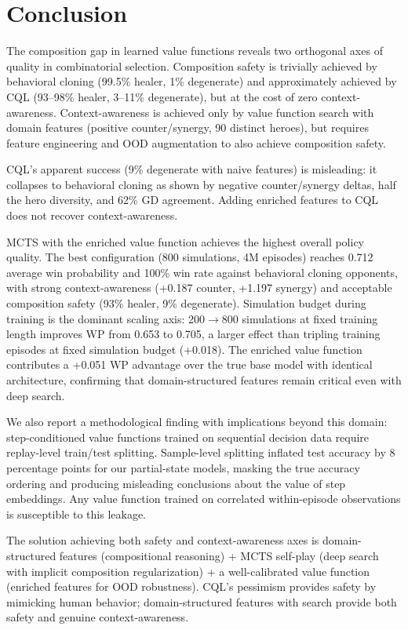 \documentclass[journal]{IEEEtran}
\begin{document}
\section{Conclusion}

The composition gap in learned value functions reveals two orthogonal axes of quality in combinatorial selection. Composition safety is trivially achieved by behavioral cloning (99.5\% healer, 1\% degenerate) and approximately achieved by CQL (93--98\% healer, 3--11\% degenerate), but at the cost of zero context-awareness. Context-awareness is achieved only by value function search with domain features (positive counter/synergy, 90 distinct heroes), but requires feature engineering and OOD augmentation to also achieve composition safety.

CQL's apparent success (9\% degenerate with naive features) is misleading: it collapses to behavioral cloning as shown by negative counter/synergy deltas, half the hero diversity, and 62\% GD agreement. Adding enriched features to CQL does not recover context-awareness.

MCTS with the enriched value function achieves the highest overall policy quality. The best configuration (800 simulations, 4M episodes) reaches 0.712 average win probability and 100\% win rate against behavioral cloning opponents, with strong context-awareness (+0.187 counter, +1.197 synergy) and acceptable composition safety (93\% healer, 9\% degenerate). Simulation budget during training is the dominant scaling axis: 200$\to$800 simulations at fixed training length improves WP from 0.653 to 0.705, a larger effect than tripling training episodes at fixed simulation budget (+0.018). The enriched value function contributes a +0.051 WP advantage over the true base model with identical architecture, confirming that domain-structured features remain critical even with deep search.

We also report a methodological finding with implications beyond this domain: step-conditioned value functions trained on sequential decision data require replay-level train/test splitting. Sample-level splitting inflated test accuracy by 8 percentage points for our partial-state models, masking the true accuracy ordering and producing misleading conclusions about the value of step embeddings. Any value function trained on correlated within-episode observations is susceptible to this leakage.

The solution achieving both safety and context-awareness axes is domain-structured features (compositional reasoning) + MCTS self-play (deep search with implicit composition regularization) + a well-calibrated value function (enriched features for OOD robustness). CQL's pessimism provides safety by mimicking human behavior; domain-structured features with search provide both safety and genuine context-awareness.
\end{document}

